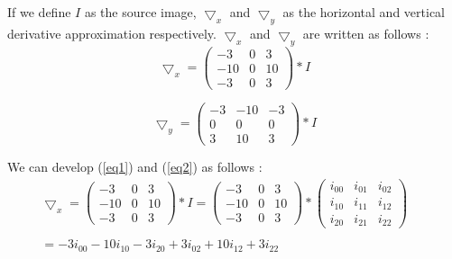 \documentclass[12pt,a4paper]{article}
\begin{document}
If we define $I$ as the source image, $\bigtriangledown_x$ and $\bigtriangledown_y$ as the horizontal and vertical derivative approximation respectively. $\bigtriangledown_x$ and $\bigtriangledown_y$ are written as follows :\\

\begin{equation}\label{eq1}
\bigtriangledown_x = \begin{pmatrix}
-3 & 0 & 3 \\ 
-10 & 0 & 10 \\ 
-3 & 0 & 3
\end{pmatrix}*I
\end{equation}

\vspace{0.5cm}

\begin{equation}\label{eq2}
\bigtriangledown_y = \begin{pmatrix}
-3 & -10 & -3 \\ 
0 & 0 & 0 \\ 
3 & 10 & 3
\end{pmatrix}*I
\end{equation}

\vspace{0.5cm}
\newpage
We can develop (\ref{eq1}) and (\ref{eq2}) as follows :\\

\begin{equation}\label{eq3}
\begin{matrix}
\bigtriangledown_x = \begin{pmatrix}
-3 & 0 & 3 \\ 
-10 & 0 & 10 \\ 
-3 & 0 & 3
\end{pmatrix}*I  = \begin{pmatrix}
-3 & 0 & 3 \\ 
-10 & 0 & 10 \\ 
-3 & 0 & 3
\end{pmatrix}* \begin{pmatrix}
i_{00} & i_{01} & i_{02} \\ 
i_{10} & i_{11} & i_{12}\\ 
i_{20} & i_{21} & i_{22}
\end{pmatrix}  \\ 
& & \\
 =  -3i_{00}-10i_{10}-3i_{20}+3i_{02}+10i_{12}+3i_{22} \\ 
\end{matrix}
\end{equation}
\end{document}
